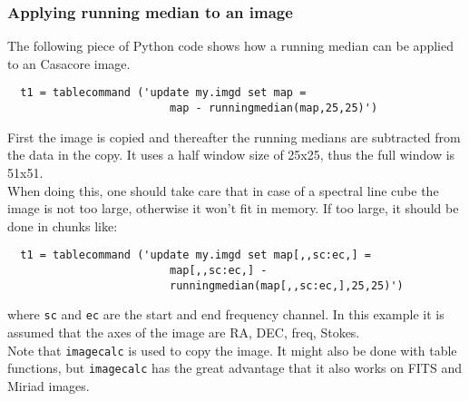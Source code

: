 \subsubsection{\label{TAQL:RUNEXAMPLES}Applying running median to an image}
The following piece of Python code shows how a running median can 
be applied to an Casacore image.
\begin{verbatim}
  t1 = tablecommand ('update my.imgd set map =
                         map - runningmedian(map,25,25)')
\end{verbatim}
First the image is copied and thereafter the running medians are
subtracted from the data in the copy. It uses a half window size 
of 25x25, thus the full window is 51x51.
\\When doing this, one should take care that in case of a spectral
line cube the image is not too large, otherwise it won't fit in
memory. If too large, it should be done in chunks like:
\begin{verbatim}
  t1 = tablecommand ('update my.imgd set map[,,sc:ec,] =
                         map[,,sc:ec,] -
                         runningmedian(map[,,sc:ec,],25,25)')
\end{verbatim}
where \texttt{sc} and \texttt{ec} are the start and end frequency
channel.
In this example it is assumed that the axes of the image are RA, DEC,
freq, Stokes.
\\Note that \texttt{imagecalc} is used to copy the image. It might
also be done with table functions, but \texttt{imagecalc} has the
great advantage that it also works on FITS and Miriad images.

